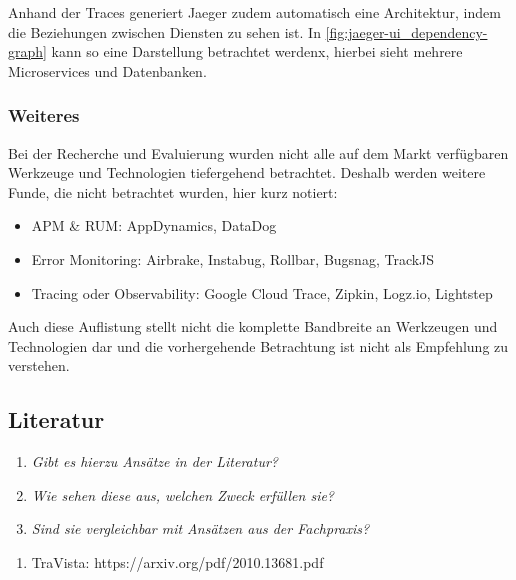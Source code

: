Anhand der Traces generiert Jaeger zudem automatisch eine Architektur, indem die Beziehungen zwischen Diensten zu sehen ist. In \autoref{fig:jaeger-ui_dependency-graph} kann so eine Darstellung betrachtet werdenx, hierbei sieht mehrere Microservices und Datenbanken.

\subsubsection{Weiteres}
\label{sec:weitere-werkzeuge}

Bei der Recherche und Evaluierung wurden nicht alle auf dem Markt verfügbaren Werkzeuge und Technologien tiefergehend betrachtet. Deshalb werden weitere Funde, die nicht betrachtet wurden, hier kurz notiert:

\begin{itemize}
	\item APM \& RUM: AppDynamics, DataDog
	\item Error Monitoring: Airbrake, Instabug, Rollbar, Bugsnag, TrackJS
	\item Tracing oder Observability: Google Cloud Trace, Zipkin, Logz.io, Lightstep
\end{itemize}

Auch diese Auflistung stellt nicht die komplette Bandbreite an Werkzeugen und Technologien dar und die vorhergehende Betrachtung ist nicht als Empfehlung zu verstehen.

\subsection{Literatur}

\begin{enumerate}
	\item \textit{Gibt es hierzu Ansätze in der Literatur?}
	\item \textit{Wie sehen diese aus, welchen Zweck erfüllen sie?}
	\item \textit{Sind sie vergleichbar mit Ansätzen aus der Fachpraxis?}
\end{enumerate}

{\color{red}
\begin{enumerate}
	\item TraVista: https://arxiv.org/pdf/2010.13681.pdf
\end{enumerate}
}